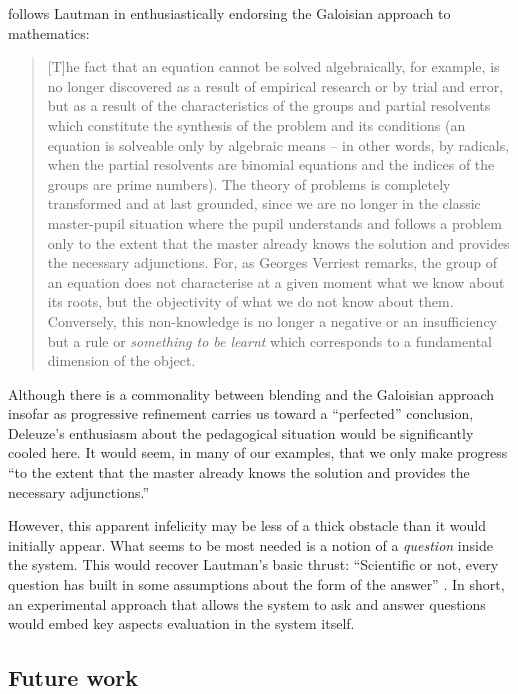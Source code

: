 \cite[pp. 227--228]{deleuze1994difference} follows
Lautman in enthusiastically endorsing the Galoisian approach to
mathematics:
\begin{quote}
[T]he fact that an equation cannot be solved algebraically, for
example, is no longer discovered as a result of empirical research or
by trial and error, but as a result of the characteristics of the
groups and partial resolvents which constitute the synthesis of the
problem and its conditions (an equation is solveable only by algebraic
means -- in other words, by radicals, when the partial resolvents are
binomial equations and the indices of the groups are prime numbers).
The theory of problems is completely transformed and at last grounded,
since we are no longer in the classic master-pupil situation where the
pupil understands and follows a problem only to the extent that the
master already knows the solution and provides the necessary
adjunctions.  For, as Georges Verriest remarks, the group of an
equation does not characterise at a given moment what we know about
its roots, but the objectivity of what we do not know about them.
Conversely, this non-knowledge is no longer a negative or an
insufficiency but a rule or \emph{something to be learnt} which
corresponds to a fundamental dimension of the object.
\end{quote}

Although there is a commonality between blending and the
Galoisian approach insofar as progressive refinement carries us toward a
``perfected'' conclusion, Deleuze's enthusiasm about the pedagogical
situation would be significantly cooled here.  It would seem, in many
of our examples, that we only make progress ``to the extent that the
master already knows the solution and provides the necessary
adjunctions.''

However, this apparent infelicity may be less of a thick obstacle than
it would initially appear.  What seems to be most needed is a notion of a \emph{question} inside the system.  This would recover Lautman's basic
thrust: ``Scientific or not, every question has built in some
assumptions about the form of the answer'' \cite{larvor2011albert}.
In short, an experimental approach that allows the system to ask
and answer questions would embed key aspects evaluation in the system itself.

\subsection{Future work}

